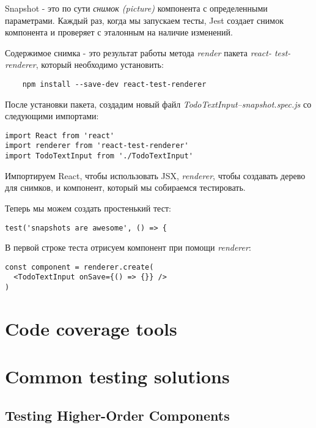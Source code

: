 Snapshot - это по сути \textit{снимок (picture)} компонента с определенными параметрами. Каждый раз, когда мы запускаем тесты, Jest создает снимок компонента и проверяет с эталонным на наличие изменений.

Содержимое снимка - это результат работы метода \textit{render} пакета \textit{react- test-renderer}, который необходимо установить:

\begin{lstlisting}
	npm install --save-dev react-test-renderer
\end{lstlisting}

После установки пакета, создадим новый файл \textit{TodoTextInput–snapshot.spec.js} со следующими импортами:

\begin{lstlisting}
import React from 'react'
import renderer from 'react-test-renderer'
import TodoTextInput from './TodoTextInput'
\end{lstlisting}

Импортируем React, чтобы использовать JSX, \textit{renderer}, чтобы создавать дерево для снимков, и компонент, который мы собираемся тестировать.

Теперь мы можем создать простенький тест:

\begin{lstlisting}
test('snapshots are awesome', () => {
\end{lstlisting}

В первой строке теста отрисуем компонент при помощи \textit{renderer}:

\begin{lstlisting}
const component = renderer.create(
  <TodoTextInput onSave={() => {}} />
)
\end{lstlisting}



\section{Code coverage tools}

\section{Common testing solutions}

\subsection{Testing Higher-Order Components}

